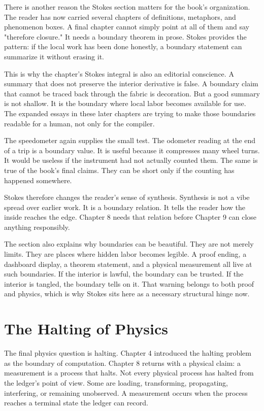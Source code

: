 There is another reason the Stokes section matters for the book's organization.
The reader has now carried several chapters of definitions, metaphors, and
phenomenon boxes. A final chapter cannot simply point at all of them and say
"therefore closure." It needs a boundary theorem in prose. Stokes provides the
pattern: if the local work has been done honestly, a boundary statement can
summarize it without erasing it.

This is why the chapter's Stokes integral is also an editorial conscience. A
summary that does not preserve the interior derivative is false. A boundary
claim that cannot be traced back through the fabric is decoration. But a good
summary is not shallow. It is the boundary where local labor becomes available
for use. The expanded essays in these later chapters are trying to make those
boundaries readable for a human, not only for the compiler.

The speedometer again supplies the small test. The odometer reading at the end
of a trip is a boundary value. It is useful because it compresses many wheel
turns. It would be useless if the instrument had not actually counted them. The
same is true of the book's final claims. They can be short only if the counting
has happened somewhere.

Stokes therefore changes the reader's sense of synthesis. Synthesis is not a
vibe spread over earlier work. It is a boundary relation. It tells the reader
how the inside reaches the edge. Chapter 8 needs that relation before Chapter 9
can close anything responsibly.

The section also explains why boundaries can be beautiful. They are not merely
limits. They are places where hidden labor becomes legible. A proof ending, a
dashboard display, a theorem statement, and a physical measurement all live at
such boundaries. If the interior is lawful, the boundary can be trusted. If the
interior is tangled, the boundary tells on it. That warning belongs to both
proof and physics, which is why Stokes sits here as a necessary structural
hinge now.

\section{The Halting of Physics}
\label{se:halting-of-physics}

The final physics question is halting. Chapter 4 introduced the halting problem
as the boundary of computation. Chapter 8 returns with a physical claim: a
measurement is a process that halts. Not every physical process has halted from
the ledger's point of view. Some are loading, transforming, propagating,
interfering, or remaining unobserved. A measurement occurs when the process
reaches a terminal state the ledger can record.

